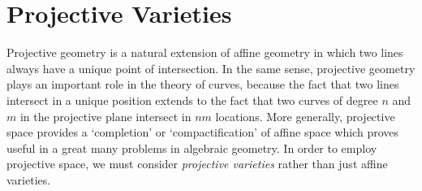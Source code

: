 
\section{Projective Varieties}

Projective geometry is a natural extension of affine geometry in which two lines always have a unique point of intersection. In the same sense, projective geometry plays an important role in the theory of curves, because the fact that two lines intersect in a unique position extends to the fact that two curves of degree $n$ and $m$ in the projective plane intersect in $nm$ locations. More generally, projective space provides a `completion' or `compactification' of affine space which proves useful in a great many problems in algebraic geometry. In order to employ projective space, we must consider \emph{projective varieties} rather than just affine varieties.

